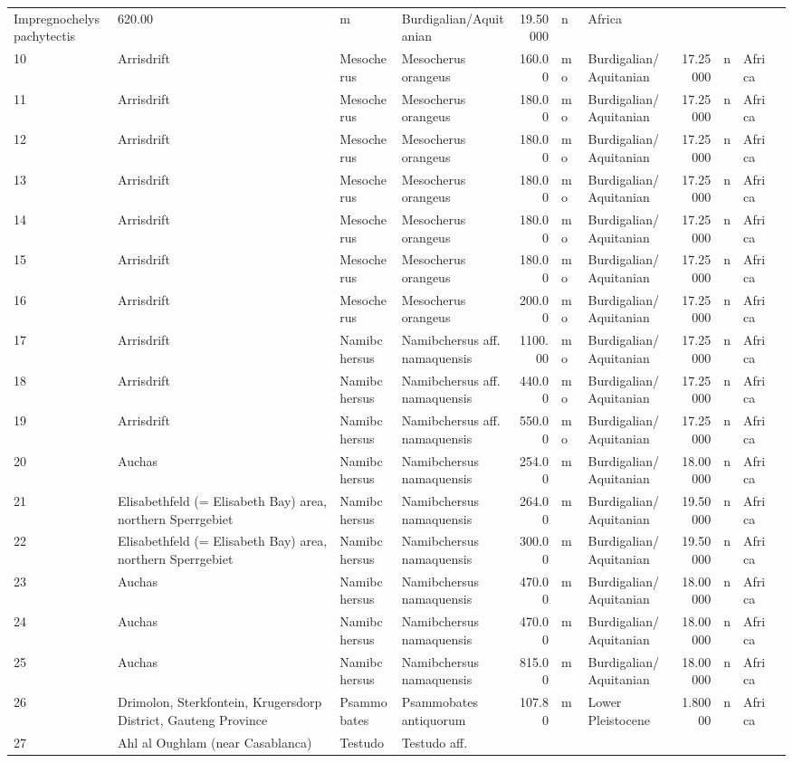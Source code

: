 \begin{landscape}
{\begin{longtable}[]{@{}llllrllrlll@{}}
	Impregnochelys pachytectis & 620.00 & m & Burdigalian/Aquitanian &
	19.50000 & n & Africa\tabularnewline
	10 & Arrisdrift & Mesocherus & Mesocherus orangeus & 160.00 & mo &
	Burdigalian/Aquitanian & 17.25000 & n & Africa\tabularnewline
	11 & Arrisdrift & Mesocherus & Mesocherus orangeus & 180.00 & mo &
	Burdigalian/Aquitanian & 17.25000 & n & Africa\tabularnewline
	12 & Arrisdrift & Mesocherus & Mesocherus orangeus & 180.00 & mo &
	Burdigalian/Aquitanian & 17.25000 & n & Africa\tabularnewline
	13 & Arrisdrift & Mesocherus & Mesocherus orangeus & 180.00 & mo &
	Burdigalian/Aquitanian & 17.25000 & n & Africa\tabularnewline
	14 & Arrisdrift & Mesocherus & Mesocherus orangeus & 180.00 & mo &
	Burdigalian/Aquitanian & 17.25000 & n & Africa\tabularnewline
	15 & Arrisdrift & Mesocherus & Mesocherus orangeus & 180.00 & mo &
	Burdigalian/Aquitanian & 17.25000 & n & Africa\tabularnewline
	16 & Arrisdrift & Mesocherus & Mesocherus orangeus & 200.00 & mo &
	Burdigalian/Aquitanian & 17.25000 & n & Africa\tabularnewline
	17 & Arrisdrift & Namibchersus & Namibchersus aff. namaquensis & 1100.00
	& mo & Burdigalian/Aquitanian & 17.25000 & n & Africa\tabularnewline
	18 & Arrisdrift & Namibchersus & Namibchersus aff. namaquensis & 440.00
	& mo & Burdigalian/Aquitanian & 17.25000 & n & Africa\tabularnewline
	19 & Arrisdrift & Namibchersus & Namibchersus aff. namaquensis & 550.00
	& mo & Burdigalian/Aquitanian & 17.25000 & n & Africa\tabularnewline
	20 & Auchas & Namibchersus & Namibchersus namaquensis & 254.00 & m &
	Burdigalian/Aquitanian & 18.00000 & n & Africa\tabularnewline
	21 & Elisabethfeld (= Elisabeth Bay) area, northern Sperrgebiet &
	Namibchersus & Namibchersus namaquensis & 264.00 & m &
	Burdigalian/Aquitanian & 19.50000 & n & Africa\tabularnewline
	22 & Elisabethfeld (= Elisabeth Bay) area, northern Sperrgebiet &
	Namibchersus & Namibchersus namaquensis & 300.00 & m &
	Burdigalian/Aquitanian & 19.50000 & n & Africa\tabularnewline
	23 & Auchas & Namibchersus & Namibchersus namaquensis & 470.00 & m &
	Burdigalian/Aquitanian & 18.00000 & n & Africa\tabularnewline
	24 & Auchas & Namibchersus & Namibchersus namaquensis & 470.00 & m &
	Burdigalian/Aquitanian & 18.00000 & n & Africa\tabularnewline
	25 & Auchas & Namibchersus & Namibchersus namaquensis & 815.00 & m &
	Burdigalian/Aquitanian & 18.00000 & n & Africa\tabularnewline
	26 & Drimolon, Sterkfontein, Krugersdorp District, Gauteng Province &
	Psammobates & Psammobates antiquorum & 107.80 & m & Lower Pleistocene &
	1.80000 & n & Africa\tabularnewline
	27 & Ahl al Oughlam (near Casablanca) & Testudo & Testudo aff.

\end{longtable}}
\end{landscape}
